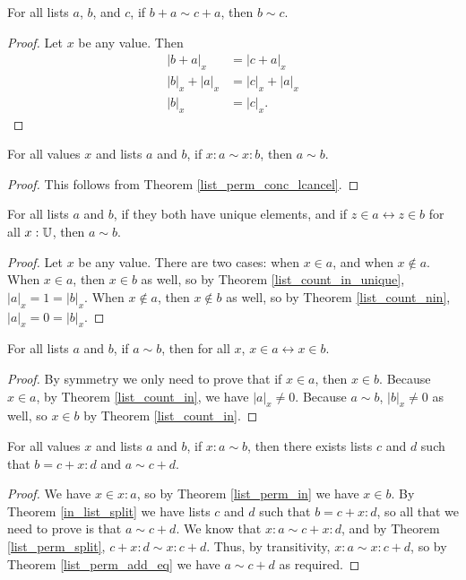 \documentclass[../math.tex]{subfiles}
\begin{document}
\begin{theorem} \label{list_perm_conc_rcancel}
    For all lists $a$, $b$, and $c$, if $b + a \sim c + a$, then $b \sim c$.
\end{theorem}
\begin{proof}
    Let $x$ be any value.  Then
    \begin{align*}
        |b + a|_x &= |c + a|_x \\
        |b|_x + |a|_x &= |c|_x + |a|_x \\
        |b|_x &= |c|_x.
    \end{align*}
\end{proof}

\begin{theorem} \label{list_perm_add_eq}
    For all values $x$ and lists $a$ and $b$, if $x : a \sim x : b$, then $a
    \sim b$.
\end{theorem}
\begin{proof}
    This follows from Theorem \ref{list_perm_conc_lcancel}.
\end{proof}

\begin{theorem} \label{list_in_unique_perm}
    For all lists $a$ and $b$, if they both have unique elements, and if $z \in
    a \leftrightarrow z \in b$ for all $x : \mathbb{U}$, then $a \sim b$.
\end{theorem}
\begin{proof}
    Let $x$ be any value.  There are two cases: when $x \in a$, and when $x
    \notin a$.  When $x \in a$, then $x \in b$ as well, so by Theorem
    \ref{list_count_in_unique}, $|a|_x = 1 = |b|_x$.  When $x \notin a$, then $x
    \notin b$ as well, so by Theorem \ref{list_count_nin}, $|a|_x = 0 = |b|_x$.
\end{proof}

\begin{theorem} \label{list_perm_in}
    For all lists $a$ and $b$, if $a \sim b$, then for all $x$, $x \in a
    \leftrightarrow x \in b$.
\end{theorem}
\begin{proof}
    By symmetry we only need to prove that if $x \in a$, then $x \in b$.
    Because $x \in a$, by Theorem \ref{list_count_in}, we have $|a|_x \neq 0$.
    Because $a \sim b$, $|b|_x \neq 0$ as well, so $x \in b$ by Theorem
    \ref{list_count_in}.
\end{proof}

\begin{theorem} \label{list_perm_split_eq}
    For all values $x$ and lists $a$ and $b$, if $x : a \sim b$, then there
    exists lists $c$ and $d$ such that $b = c + x : d$ and $a \sim c + d$.
\end{theorem}
\begin{proof}
    We have $x \in x : a$, so by Theorem \ref{list_perm_in} we have $x \in b$.
    By Theorem \ref{in_list_split} we have lists $c$ and $d$ such that $b = c +
    x : d$, so all that we need to prove is that $a \sim c + d$.  We know that
    $x : a \sim c + x : d$, and by Theorem \ref{list_perm_split}, $c + x : d
    \sim x : c + d$.  Thus, by transitivity, $x : a \sim x : c + d$, so by
    Theorem \ref{list_perm_add_eq} we have $a \sim c + d$ as required.
\end{proof}
\end{document}
